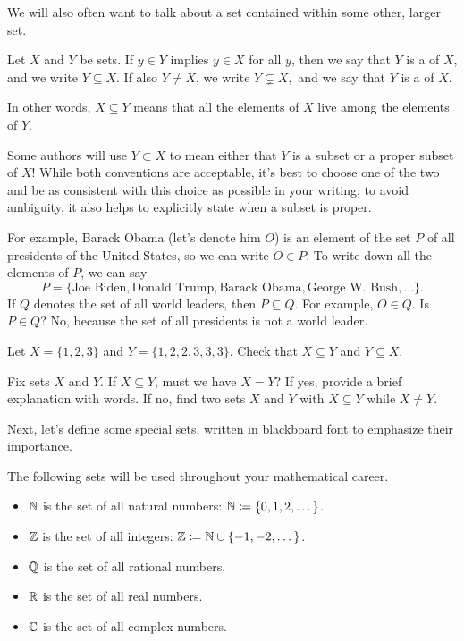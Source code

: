 \documentclass[../notes.tex]{subfiles}
\begin{document}
We will also often want to talk about a set contained within some other, larger set.
\begin{definition}[subset]
    Let $X$ and $Y$ be sets. If $y\in Y$ implies $y\in X$ for all $y$, then we say that $Y$ is a  of $X$, and we write $Y \subseteq X.$ If also $Y \neq X$, we write $Y \subsetneq X,$ and we say that $Y$ is a  of $X$.
\end{definition}
In other words, $X\subseteq Y$ means that all the elements of $X$ live among the elements of $Y$.
\begin{warn}
    Some authors will use $Y \subset X$ to mean either that $Y$ is a subset or a proper subset of $X$! While both conventions are acceptable, it's best to choose one of the two and be as consistent with this choice as possible in your writing; to avoid ambiguity, it also helps to explicitly state when a subset is proper.
\end{warn}
For example, Barack Obama (let's denote him $O$) is an element of the set $P$ of all presidents of the United States, so we can write $O\in P$. To write down all the elements of $P$, we can say
\[P = \{\text{Joe Biden}, \text{Donald Trump}, \text{Barack Obama}, \text{George W. Bush}, \dots\}.\]
If $Q$ denotes the set of all world leaders, then $P \subseteq Q$. For example, $O \in Q$. Is $P \in Q$? No, because the set of all presidents is not a world leader.
\begin{exercise}
    Let $X=\{1,2,3\}$ and $Y=\{1,2,2,3,3,3\}$. Check that $X\subseteq Y$ and $Y\subseteq X$.
\end{exercise}
\begin{exercise}
    Fix sets $X$ and $Y$. If $X\subseteq Y$, must we have $X=Y$? If yes, provide a brief explanation with words. If no, find two sets $X$ and $Y$ with $X\subseteq Y$ while $X\ne Y$.
\end{exercise}
Next, let's define some special sets, written in blackboard font to emphasize their importance.
\begin{definition}
    The following sets will be used throughout your mathematical career.
    \begin{itemize}
        \item $\mathbb N$ is the set of all natural numbers: $\mathbb N \coloneqq \{0, 1, 2, \dots\}$.
        \item $\mathbb Z$ is the set of all integers: $\mathbb Z \coloneqq \mathbb N \cup \{-1, -2, \dots\}$.
        \item $\mathbb Q$ is the set of all rational numbers.
        \item $\mathbb R$ is the set of all real numbers.
        \item $\mathbb C$ is the set of all complex numbers.
    \end{itemize}
\end{definition}
\end{document}
